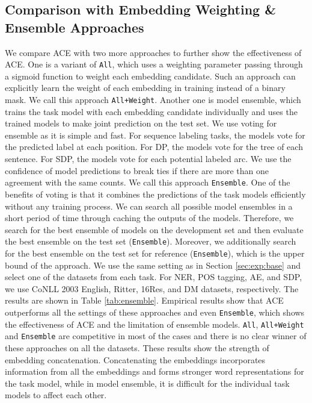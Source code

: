 \documentclass[11pt,a4paper]{article}
\begin{document}
\subsection{Comparison with Embedding Weighting \& Ensemble Approaches}
\label{sec:ensemble}
We compare ACE with two more approaches to further show the effectiveness of ACE. One is a variant of \texttt{All}, which uses a weighting parameter  passing through a sigmoid function to weight each embedding candidate. Such an approach can explicitly learn the weight of each embedding in training instead of a binary mask. We call this approach \texttt{All+Weight}. Another one is model ensemble, which trains the task model with each embedding candidate individually and uses the trained models to make joint prediction on the test set. We use voting for ensemble as it is simple and fast. For sequence labeling tasks, the models vote for the predicted label at each position. For DP, the models vote for the tree of each sentence. For SDP, the models vote for each potential labeled arc. We use the confidence of model predictions to break ties if there are more than one agreement with the same counts. We call this approach \texttt{Ensemble}. One of the benefits of voting is that it combines the predictions of the task models efficiently without any training process. We can search all possible  model ensembles in a short period of time through caching the outputs of the models. Therefore, we search for the best ensemble of models on the development set and then evaluate the best ensemble on the test set (\texttt{Ensemble}). Moreover, we additionally search for the best ensemble on the test set for reference (\texttt{Ensemble}), which is the upper bound of the approach. We use the same setting as in Section \ref{sec:exp:base} and select one of the datasets from each task. For NER, POS tagging, AE, and SDP, we use CoNLL 2003 English, Ritter, 16Res, and DM datasets, respectively. The results are shown in Table \ref{tab:ensemble}. Empirical results show that ACE outperforms all the settings of these approaches and even \texttt{Ensemble}, which shows the effectiveness of ACE and the limitation of ensemble models. \texttt{All}, \texttt{All+Weight} and \texttt{Ensemble} are competitive in most of the cases and there is no clear winner of these approaches on all the datasets. These results show the strength of embedding concatenation. Concatenating the embeddings incorporates information from all the embeddings and forms stronger word representations for the task model, while in model ensemble, it is difficult for the individual task models to affect each other.
\end{document}
